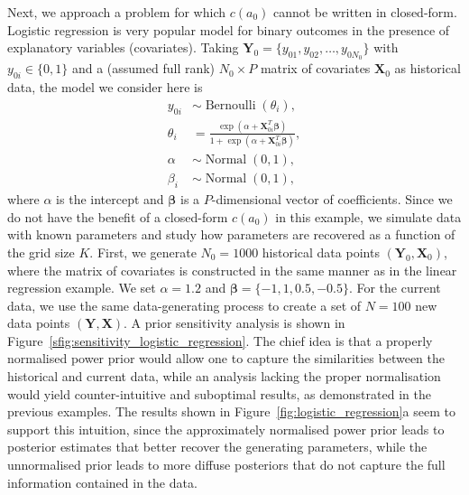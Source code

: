 \documentclass[a4paper, notitlepage, 11pt]{article}
\begin{document}
Next, we approach a problem for which $c(a_0)$ cannot be written in closed-form.
Logistic regression is very popular model for binary outcomes in the presence of explanatory variables (covariates). 
Taking $\boldsymbol Y_0 = \{y_{01}, y_{02}, \ldots, y_{0N_0} \}$ with $y_{0i} \in \{0, 1\}$ and a (assumed full rank) $N_0 \times P$ matrix of covariates $\boldsymbol X_0$ as historical data, the model we consider here is 
\begin{align*}
 y_{0i} &\sim \operatorname{Bernoulli}(\theta_i), \\
 \theta_i &= \frac{\exp(\alpha + \boldsymbol X_{0i}^T \boldsymbol \beta)}{1 + \exp(\alpha + \boldsymbol X_{0i}^T \boldsymbol \beta)},\\
 \alpha & \sim \operatorname{Normal}(0, 1), \\
 \beta_i &\sim \operatorname{Normal}(0, 1),
\end{align*}
where $\alpha$ is the intercept and $\boldsymbol\beta$ is a $P$-dimensional vector of coefficients.
Since we do not have the benefit of a closed-form $c(a_0)$ in this example, we simulate data with known parameters and study how parameters are recovered as a function of the grid size $K$.
First, we generate $N_0 = 1000$ historical data points $(\boldsymbol Y_0, \boldsymbol X_0)$, where the matrix of covariates is constructed in the same manner as in the linear regression example.
We set $\alpha = 1.2$ and $\boldsymbol\beta = \{ -1, 1, 0.5, -0.5\}$.
For the current data, we use the same data-generating process to create a set of $N = 100$ new data points $(\boldsymbol Y, \boldsymbol X)$.
A prior sensitivity analysis is shown in Figure~\ref{sfig:sensitivity_logistic_regression}.
The chief idea is that a properly normalised power prior would allow one to capture the similarities between the historical and current data, while an analysis lacking the proper normalisation would yield counter-intuitive and suboptimal results, as demonstrated in the previous examples.
The results shown in Figure~\ref{fig:logistic_regression}a seem to support this intuition, since the approximately normalised power prior leads to posterior estimates that better recover the generating parameters, while the unnormalised prior leads to more diffuse posteriors that do not capture the full information contained in the data. 
\end{document}
